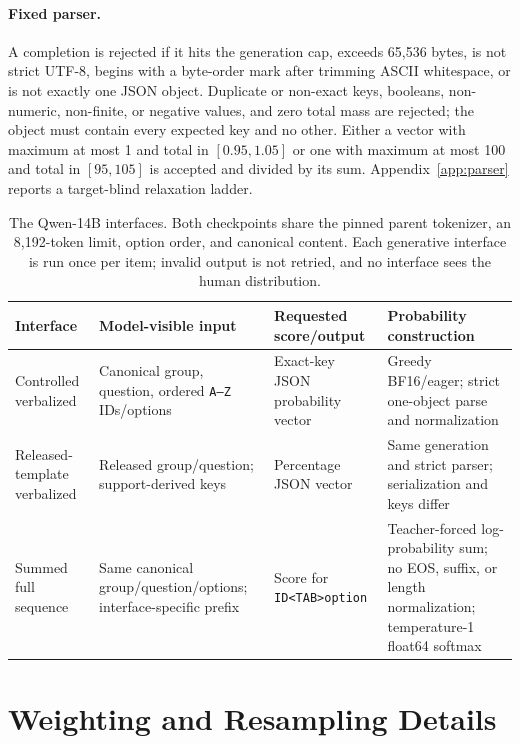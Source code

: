 \documentclass[11pt]{article}
\begin{document}
\paragraph{Fixed parser.}
A completion is rejected if it hits the generation cap, exceeds 65,536 bytes,
is not strict UTF-8, begins with a byte-order mark after trimming ASCII
whitespace, or is not exactly one JSON object. Duplicate or non-exact keys,
booleans, non-numeric, non-finite, or negative values, and zero total mass are
rejected; the object must contain every expected key and no other. Either a
vector with maximum at most 1 and total in $[0.95,1.05]$ or one with maximum
at most 100 and total in $[95,105]$ is accepted and divided by its sum.
Appendix~\ref{app:parser} reports a target-blind relaxation ladder.

\begin{table}[t]
\centering
\small
\setlength{\tabcolsep}{2.5pt}
\begin{tabular}{@{}p{}p{}p{}p{}@{}}
\toprule
Interface & Model-visible input & Requested score/output & Probability construction \\
\midrule
Controlled verbalized & Canonical group, question, ordered \texttt{A--Z}
IDs/options & Exact-key JSON probability vector & Greedy BF16/eager; strict
one-object parse and normalization \\
Released-template verbalized & Released group/question; support-derived keys & Percentage
JSON vector & Same generation and strict parser; serialization and keys differ \\
Summed full sequence & Same canonical group/question/options;
interface-specific prefix & Score for \texttt{\char32 ID<TAB>option} &
Teacher-forced log-probability sum; no EOS, suffix, or length normalization;
temperature-1 float64 softmax \\
\bottomrule
\end{tabular}
\caption{The Qwen-14B interfaces. Both checkpoints share the pinned parent
tokenizer, an 8,192-token limit, option order, and canonical content. Each
generative interface is run once per item; invalid output is not retried, and
no interface sees the human distribution.}
\label{tab:elicitation}
\end{table}

\section{Weighting and Resampling Details}
\label{app:resampling}
\end{document}
